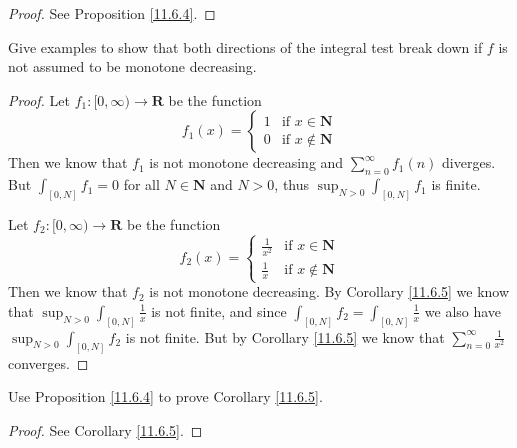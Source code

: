 \begin{proof}
    See Proposition \ref{11.6.4}.
\end{proof}

\begin{exercise}\label{ex 11.6.4}
    Give examples to show that both directions of the integral test break down if \(f\) is not assumed to be monotone decreasing.
\end{exercise}

\begin{proof}
    Let \(f_1 : [0, \infty) \to \mathbf{R}\) be the function
    \[
        f_1(x) = \begin{cases}
            1 & \text{if } x \in \mathbf{N}    \\
            0 & \text{if } x \notin \mathbf{N}
        \end{cases}
    \]
    Then we know that \(f_1\) is not monotone decreasing and \(\sum_{n = 0}^\infty f_1(n)\) diverges.
    But \(\int_{[0, N]} f_1 = 0\) for all \(N \in \mathbf{N}\) and \(N > 0\), thus \(\sup_{N > 0} \int_{[0, N]} f_1\) is finite.

    Let \(f_2 : [0, \infty) \to \mathbf{R}\) be the function
    \[
        f_2(x) = \begin{cases}
            \frac{1}{x^2} & \text{if } x \in \mathbf{N}    \\
            \frac{1}{x}   & \text{if } x \notin \mathbf{N}
        \end{cases}
    \]
    Then we know that \(f_2\) is not monotone decreasing.
    By Corollary \ref{11.6.5} we know that \(\sup_{N > 0} \int_{[0, N]} \frac{1}{x}\) is not finite, and since \(\int_{[0, N]} f_2 = \int_{[0, N]} \frac{1}{x}\) we also have \(\sup_{N > 0} \int_{[0, N]} f_2\) is not finite.
    But by Corollary \ref{11.6.5} we know that \(\sum_{n = 0}^\infty \frac{1}{x^2}\) converges.
\end{proof}

\begin{exercise}\label{ex 11.6.5}
    Use Proposition \ref{11.6.4} to prove Corollary \ref{11.6.5}.
\end{exercise}

\begin{proof}
    See Corollary \ref{11.6.5}.
\end{proof}